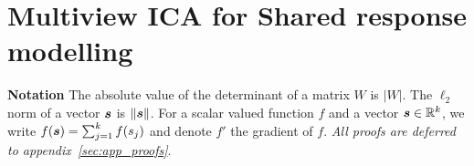 
%
%
%
%
%
\section{Multiview ICA for Shared response modelling}
\label{sec:mvica}
\textbf{Notation} The absolute value of the determinant of a matrix $W$ is $|W|$.
%
The $\ell_2$ norm of a vector $\boldsymbol{s}$ is $\|\boldsymbol{s}\|$.
%
For a scalar valued function $f$ and a vector $\boldsymbol{s} \in \mathbb{R}^k$, we write $f(\boldsymbol{s}) = \sum_{j=1}^kf(s_j)$ and denote $f'$ the gradient of $f$.
%
\emph{All proofs are deferred to appendix~\ref{sec:app_proofs}}.
%
